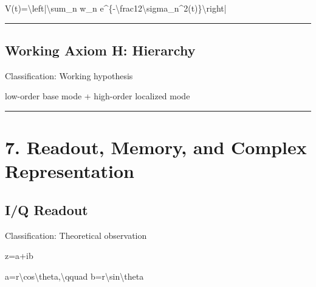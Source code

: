 \documentclass[
  a4paper,
]{article}
\newenvironment{Shaded}{}{}
\newcommand{\NormalTok}[1]{#1}
\begin{document}
\begin{Shaded}
\begin{Highlighting}[]
\NormalTok{V(t)=\textbackslash{}left|\textbackslash{}sum\_n w\_n e\^{}\{{-}\textbackslash{}frac12\textbackslash{}sigma\_n\^{}2(t)\}\textbackslash{}right|}
\end{Highlighting}
\end{Shaded}

\begin{center}\rule{0.5\linewidth}{0.5pt}\end{center}

\subsection{Working Axiom H: Hierarchy}\label{working-axiom-h-hierarchy}

Classification: Working hypothesis

\begin{Shaded}
\begin{Highlighting}[]
\NormalTok{low{-}order base mode}
\NormalTok{+ high{-}order localized mode}
\end{Highlighting}
\end{Shaded}

\begin{center}\rule{0.5\linewidth}{0.5pt}\end{center}

\section{7. Readout, Memory, and Complex
Representation}\label{readout-memory-and-complex-representation}

\subsection{I/Q Readout}\label{iq-readout}

Classification: Theoretical observation

\begin{Shaded}
\begin{Highlighting}[]
\NormalTok{z=a+ib}
\end{Highlighting}
\end{Shaded}

\begin{Shaded}
\begin{Highlighting}[]
\NormalTok{a=r\textbackslash{}cos\textbackslash{}theta,\textbackslash{}qquad b=r\textbackslash{}sin\textbackslash{}theta}
\end{Highlighting}
\end{Shaded}
\end{document}
